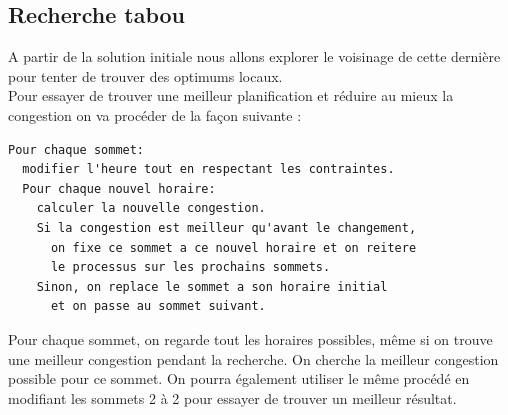 \documentclass[a4paper,11pt]{article}
\begin{document}
 	\subsection{Recherche tabou}
 		A partir de la solution initiale nous allons explorer le voisinage de cette dernière pour tenter de trouver des optimums locaux.\\
 		
 		Pour essayer de trouver une meilleur planification et réduire au mieux la congestion on va procéder de la façon suivante :\\
 		\begin{lstlisting}
Pour chaque sommet:
  modifier l'heure tout en respectant les contraintes.
  Pour chaque nouvel horaire:
    calculer la nouvelle congestion.
    Si la congestion est meilleur qu'avant le changement,
      on fixe ce sommet a ce nouvel horaire et on reitere 
      le processus sur les prochains sommets.
    Sinon, on replace le sommet a son horaire initial 
      et on passe au sommet suivant.
		\end{lstlisting}
		Pour chaque sommet, on regarde tout les horaires possibles, même si on trouve une meilleur congestion pendant la recherche. On cherche la meilleur congestion possible pour ce sommet.
		On pourra également utiliser le même procédé en modifiant les sommets 2 à 2 pour essayer de trouver un meilleur résultat.
			
\end{document}
